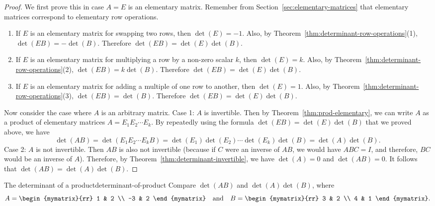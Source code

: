 \begin{proof}
  We first prove this in case $A=E$ is an elementary matrix. Remember
  from Section~\ref{sec:elementary-matrices} that elementary matrices
  correspond to elementary row operations.
  \begin{enumerate}
  \item If $E$ is an elementary matrix for swapping two rows, then
    $\det(E)=-1$. Also, by Theorem~\ref{thm:determinant-row-operations}(1),
    $\det(EB)=-\det(B)$. Therefore $\det(EB)=\det(E)\det(B)$.
  \item If $E$ is an elementary matrix for multiplying a row by a
    non-zero scalar $k$, then $\det(E)=k$. Also, by
    Theorem~\ref{thm:determinant-row-operations}(2),
    $\det(EB)=k\det(B)$. Therefore $\det(EB)=\det(E)\det(B)$.
  \item If $E$ is an elementary matrix for adding a multiple of one
    row to another, then $\det(E)=1$. Also, by
    Theorem~\ref{thm:determinant-row-operations}(3),
    $\det(EB)=\det(B)$. Therefore $\det(EB)=\det(E)\det(B)$.
  \end{enumerate}
  Now consider the case where $A$ is an arbitrary matrix. Case 1: $A$
  is invertible. Then by Theorem~\ref{thm:prod-elementary}, we can
  write $A$ as a product of elementary matrices $A=E_1E_2\cdots E_k$.
  By repeatedly using the formula $\det(EB)=\det(E)\det(B)$ that we
  proved above, we have
  \begin{equation*}
    \det(AB) = \det(E_1E_2\cdots E_kB) = \det(E_1)\det(E_2)\cdots\det(E_k)\det(B)
    = \det(A)\det(B).
  \end{equation*}
  Case 2: $A$ is not invertible. Then $AB$ is also not invertible
  (because if $C$ were an inverse of $AB$, we would have $ABC=I$, and
  therefore, $BC$ would be an inverse of $A$). Therefore, by
  Theorem~\ref{thm:determinant-invertible}, we have $\det(A)=0$ and
  $\det(AB)=0$. It follows that $\det(AB)=\det(A)\det(B)$.
\end{proof}

\begin{example}{The determinant of a product}{determinant-of-product}
  Compare $\det(AB) $ and $\det(A)\det(B)$, where
  \begin{equation*}
    A=\begin{mymatrix}{rr}
      1 & 2 \\
      -3 & 2
    \end{mymatrix}
    \quad\mbox{and}\quad
    B=\begin{mymatrix}{rr}
      3 & 2 \\
      4 & 1
    \end{mymatrix}.
  \end{equation*}
\end{example}

